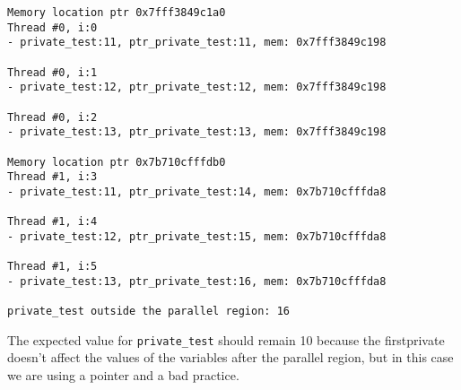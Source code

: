 \begin{examplebox}
\begin{lstlisting}[mathescape=false]
Memory location ptr 0x7fff3849c1a0
Thread #0, i:0
- private_test:11, ptr_private_test:11, mem: 0x7fff3849c198

Thread #0, i:1
- private_test:12, ptr_private_test:12, mem: 0x7fff3849c198

Thread #0, i:2
- private_test:13, ptr_private_test:13, mem: 0x7fff3849c198

Memory location ptr 0x7b710cfffdb0
Thread #1, i:3
- private_test:11, ptr_private_test:14, mem: 0x7b710cfffda8

Thread #1, i:4
- private_test:12, ptr_private_test:15, mem: 0x7b710cfffda8

Thread #1, i:5
- private_test:13, ptr_private_test:16, mem: 0x7b710cfffda8

private_test outside the parallel region: 16\end{lstlisting}
    The expected value for \texttt{private\_test} should remain 10 because the firstprivate doesn't affect the values of the variables after the parallel region, but in this case we are using a pointer and a bad practice.
\end{examplebox}

